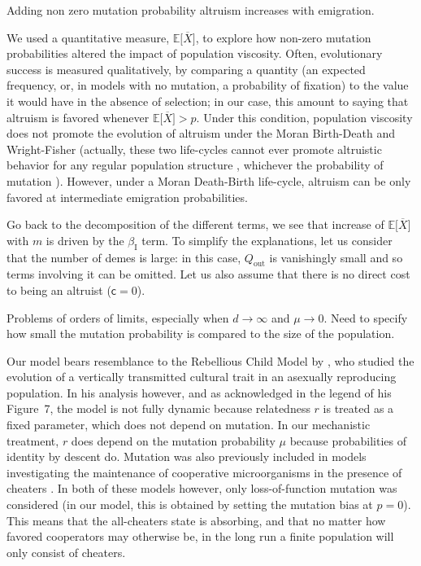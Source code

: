 \documentclass[11pt, letterpaper]{article}
\newcommand{\Esp}[1]{\mathbb{E}\big[ #1\big]}%
\newcommand{\cc}{\mathsf{c}}
\newcommand{\indirect}{\mathrm{I}}
\newcommand{\Qout}{Q_{\textrm{out}}}
\begin{document}
Adding non zero mutation probability altruism increases with emigration. 

We used a quantitative measure, $\Esp{\overline{X}}$, to explore how non-zero mutation probabilities altered the impact of population viscosity. Often, evolutionary success is measured qualitatively, by comparing a quantity (an expected frequency, or, in models with no mutation, a probability of fixation) to the value it would have in the absence of selection; in our case, this amount to saying that altruism is favored whenever $\Esp{\overline{X}} > p$. Under this condition, population viscosity does not promote the evolution of altruism under the Moran Birth-Death and Wright-Fisher (actually, these two life-cycles cannot ever promote altruistic behavior for any regular population structure \citep{Taylor2011}, whichever the probability of mutation \citep{Debarre2017}). However, under a Moran Death-Birth life-cycle, altruism can be only favored at intermediate emigration probabilities.  


Go back to the decomposition of the different terms, we see that increase of $\Esp{\overline{X}}$ with $m$ is driven by the $\beta_{\indirect}$ term. To simplify the explanations, let us consider that the number of demes is large: in this case, $\Qout$ is vanishingly small and so terms involving it can be omitted. Let us also assume that there is no direct cost to being an altruist ($\cc = 0$). 

Problems of orders of limits, especially when $d \to \infty$ and $\mu \to 0$. Need to specify how small the mutation probability is compared to the size of the population. 

Our model bears resemblance to the Rebellious Child Model by \citet{Frank1997}, who studied the evolution of a vertically transmitted cultural trait in an asexually reproducing population. In his analysis however, and as acknowledged in the legend of his Figure~7, the model is not fully dynamic because relatedness $r$ is treated as a fixed parameter, which does not depend on mutation. In our mechanistic treatment, $r$ does depend on the mutation probability $\mu$ because probabilities of identity by descent do. Mutation was also previously included in models investigating the maintenance of cooperative microorganisms in the presence of cheaters \citep{Brockhurst2007, Frank2010}. In both of these models however, only loss-of-function mutation was considered (in our model, this is obtained by setting the mutation bias at $p=0$). This means that the all-cheaters state is absorbing, and that no matter how favored cooperators may otherwise be, in the long run a finite population will only consist of cheaters. 
\end{document}
